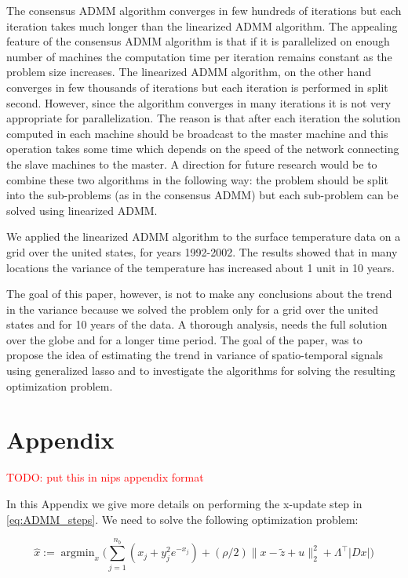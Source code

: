 \documentclass{article}
\DeclareMathOperator*{\argmin}{argmin}
\newcommand{\attn}[1]{\textcolor{red}{TODO: #1}}
\begin{document}
The consensus ADMM algorithm converges in few hundreds of iterations
but each iteration takes much longer than the linearized ADMM
algorithm. The appealing feature of the consensus ADMM algorithm is
that if it is parallelized on enough number of machines the
computation time per iteration remains constant as the problem size
increases. The linearized ADMM algorithm, on the other hand converges
in few thousands of iterations but each iteration is performed in
split second. However, since the algorithm converges in many
iterations it is not very appropriate for parallelization. The reason
is that after each iteration the solution computed in each machine
should be broadcast to the master machine and this operation takes
some time which depends on the speed of the network connecting the
slave machines to the master. A direction for future research would be
to combine these two algorithms in the following way: the problem
should be split into the sub-problems (as in the consensus ADMM) but
each sub-problem can be solved using linearized ADMM. 

We applied the linearized ADMM algorithm to the surface temperature
data on a grid over the united states, for years 1992-2002. The
results showed that in many locations the variance of the temperature
has increased about 1 unit in 10 years. 

The goal of this paper, however, is not to make any conclusions about
the trend in the variance because we solved the problem only for a
grid over the united states and for 10 years of the data. A thorough
analysis, needs the full solution over the globe and for a longer time
period. The goal of the paper, was to propose the idea of estimating
the trend in variance of spatio-temporal signals using generalized
lasso and to investigate the algorithms for solving the resulting
optimization problem. 

\section{Appendix}

\attn{put this in nips appendix format}

In this Appendix we give more details on performing the x-update step in \autoref{eq:ADMM_steps}. We need to solve the following optimization problem:

\begin{equation}
\hat{x}:=\argmin_{x} \bigg( \sum_{j=1}^{n_b} (x_j + y_j^2e^{-x_j}) + (\rho/2) \lVert x-\tilde{z} + u \lVert_2^2 + \Lambda^\top |D x| \bigg)
\label{eq:x_update_opt}
\end{equation}
\end{document}
